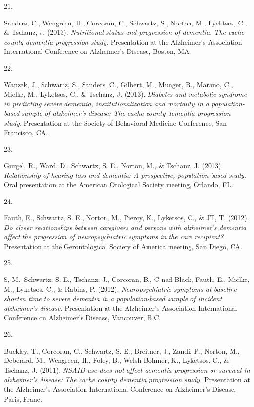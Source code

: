\documentclass[11pt,a4paper,]{moderncv}
\newlength{\csllabelwidth}
\newcommand{\CSLLeftMargin}[1]{\parbox[t]{\csllabelwidth}{#1}}
\newcommand{\CSLRightInline}[1]{\parbox[t]{\linewidth - \csllabelwidth}{#1}}
\begin{document}
\leavevmode{}%
\CSLLeftMargin{21. }
\CSLRightInline{Sanders, C., Wengreen, H., Corcoran, C., Schwartz, S.,
Norton, M., Lyektsos, C., \& Tschanz, J. (2013). \emph{Nutritional
status and progression of dementia. The cache county dementia
progression study.} Presentation at the Alzheimer's Association
International Conference on Alzheimer's Disease, Boston, MA.}

\leavevmode{}%
\CSLLeftMargin{22. }
\CSLRightInline{Wanzek, J., Schwartz, S., Sanders, C., Gilbert, M.,
Munger, R., Marano, C., Mielke, M., Lyketsos, C., \& Tschanz, J. (2013).
\emph{Diabetes and metabolic syndrome in predicting severe dementia,
institutionalization and mortality in a population-based sample of
alzheimer's disease: The cache county dementia progression study.}
Presentation at the Society of Behavioral Medicine Conference, San
Francisco, CA.}

\leavevmode{}%
\CSLLeftMargin{23. }
\CSLRightInline{Gurgel, R., Ward, D., Schwartz, S. E., Norton, M., \&
Tschanz, J. (2013). \emph{Relationship of hearing loss and dementia: A
prospective, population-based study.} Oral presentation at the American
Otological Society meeting, Orlando, FL.}

\leavevmode{}%
\CSLLeftMargin{24. }
\CSLRightInline{Fauth, E., Schwartz, S. E., Norton, M., Piercy, K.,
Lyketsos, C., \& JT, T. (2012). \emph{Do closer relationships between
caregivers and persons with alzheimer's dementia affect the progression
of neuropsychiatric symptoms in the care recipient?} Presentation at the
Gerontological Society of America meeting, San Diego, CA.}

\leavevmode{}%
\CSLLeftMargin{25. }
\CSLRightInline{S, M., Schwartz, S. E., Tschanz, J., Corcoran, B., C nad
Black, Fauth, E., Mielke, M., Lyketsos, C., \& Rabins, P. (2012).
\emph{Neuropsychiatric symptoms at baseline shorten time to severe
dementia in a population-based sample of incident alzheimer's disease.}
Presentation at the Alzheimer's Association International Conference on
Alzheimer's Disease, Vancouver, B.C.}

\leavevmode{}%
\CSLLeftMargin{26. }
\CSLRightInline{Buckley, T., Corcoran, C., Schwartz, S. E., Breitner,
J., Zandi, P., Norton, M., Deberard, M., Wengreen, H., Foley, B.,
Welsh-Bohmer, K., Lyketsos, C., \& Tschanz, J. (2011). \emph{NSAID use
does not affect dementia progression or survival in alzheimer's disease:
The cache county dementia progression study.} Presentation at the
Alzheimer's Association International Conference on Alzheimer's Disease,
Paris, Frane.}
\end{document}
